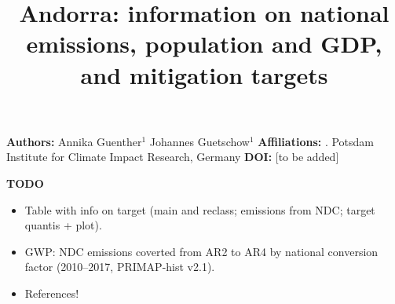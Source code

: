 \documentclass[12pt]{article}
\title{ \bfseries \color{PIKorange} Andorra: information on national emissions, population and GDP, and mitigation targets}
\begin{document}
 \maketitle

 \noindent \textbf{Authors:} \newline
 \indent Annika Guenther$^{1}$ \newline
 \indent Johannes Guetschow$^{1}$ \newline
 \noindent \textbf{Affiliations:} \newline
 . Potsdam Institute for Climate Impact Research, Germany \newline
 \noindent \textbf{DOI:} [to be added] \newline

 \textbf{TODO}
 \begin{itemize}
 \item Table with info on target (main and reclass; emissions from NDC; target quantis + plot).
 \item GWP: NDC emissions coverted from AR2 to AR4 by national conversion factor (2010--2017, PRIMAP-hist v2.1).
 \item References!
 \end{itemize}

\end{document}
